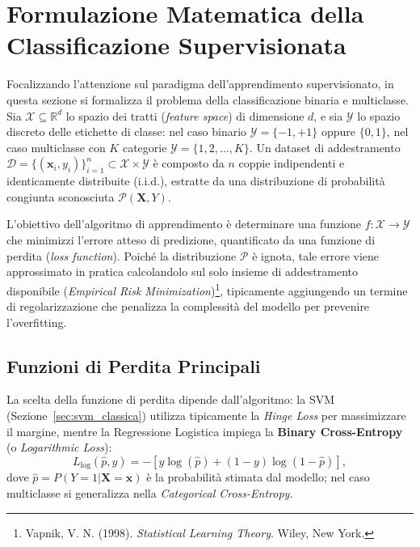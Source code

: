 \section{Formulazione Matematica della Classificazione Supervisionata}

Focalizzando l'attenzione sul paradigma dell'apprendimento supervisionato, in questa sezione si formalizza il problema della classificazione binaria e multiclasse. Sia $\mathcal{X} \subseteq \mathbb{R}^d$ lo spazio dei tratti (\textit{feature space}) di dimensione $d$, e sia $\mathcal{Y}$ lo spazio discreto delle etichette di classe: nel caso binario $\mathcal{Y} = \{-1, +1\}$ oppure $\{0, 1\}$, nel caso multiclasse con $K$ categorie $\mathcal{Y} = \{1, 2, \dots, K\}$. Un dataset di addestramento $\mathcal{D} = \{(\mathbf{x}_i, y_i)\}_{i=1}^{n} \subset \mathcal{X} \times \mathcal{Y}$ è composto da $n$ coppie indipendenti e identicamente distribuite (i.i.d.), estratte da una distribuzione di probabilità congiunta sconosciuta $\mathcal{P}(\mathbf{X}, Y)$.

L'obiettivo dell'algoritmo di apprendimento è determinare una funzione $f: \mathcal{X} \to \mathcal{Y}$ che minimizzi l'errore atteso di predizione, quantificato da una funzione di perdita (\textit{loss function}). Poiché la distribuzione $\mathcal{P}$ è ignota, tale errore viene approssimato in pratica calcolandolo sul solo insieme di addestramento disponibile (\textit{Empirical Risk Minimization})\footnote{Vapnik, V. N. (1998). \textit{Statistical Learning Theory}. Wiley, New York.}, tipicamente aggiungendo un termine di regolarizzazione che penalizza la complessità del modello per prevenire l'overfitting.

\subsection{Funzioni di Perdita Principali}
La scelta della funzione di perdita dipende dall'algoritmo: la SVM (Sezione~\ref{sec:svm_classica}) utilizza tipicamente la \textit{Hinge Loss} per massimizzare il margine, mentre la Regressione Logistica impiega la \textbf{Binary Cross-Entropy} (o \textit{Logarithmic Loss}):
\begin{equation}
L_{\text{log}}(\hat{p}, y) = - \left[ y \log(\hat{p}) + (1 - y) \log(1 - \hat{p}) \right],
\end{equation}
dove $\hat{p} = P(Y=1 | \mathbf{X}=\mathbf{x})$ è la probabilità stimata dal modello; nel caso multiclasse si generalizza nella \textit{Categorical Cross-Entropy}.

